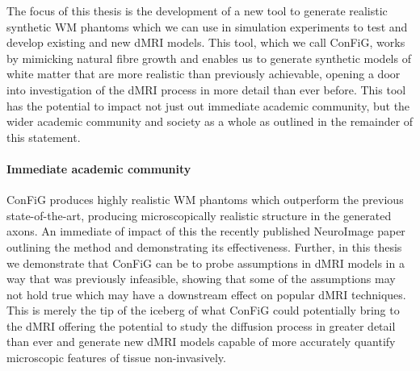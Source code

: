 \begin{comment}
In this thesis, we demonstrate the performance of \ac{ConFiG}, showing that it produces \ac{WM} phantoms at higher fibre density (an important propery for realistic phantoms) than the previous state-of-the-art while also producing microscopically realistic structure in the generated axons.
We apply \ac{ConFiG} to probe assumptions in \ac{dMRI} models in a way that was previously infeasible, showing that some of the assumptions may not hold true which may have a downstream effect on popular \ac{dMRI} techniques.

However, \ac{ConFiG} could have a wider reaching impact than that. With \ac{ConFiG} we have the potential to develop new models which will enable us to garner more detailed information from the \ac{dMRI} signal, hopefully leading to better diagnosis and monitoring of diseases such as \ac{MS}.
Not only that, but the idea behind \ac{ConFiG} could be extended to produce phantoms for other tissues including grey matter and non-brain tissues, potentially creating a whole suite of realistic tissues to build new models for all sorts of applications.

\end{comment}

The focus of this thesis is the development of a new tool to generate realistic synthetic \ac{WM} phantoms which we can use in simulation experiments to test and develop existing and new \ac{dMRI} models. This tool, which we call \acs{ConFiG}, works by mimicking natural fibre growth and enables us to generate synthetic models of white matter that are more realistic than previously achievable, opening a door into investigation of the \ac{dMRI} process in more detail than ever before.
This tool has the potential to impact not just out immediate academic community, but the wider academic community and society as a whole as outlined in the remainder of this statement.

\paragraph{Immediate academic community}
\ac{ConFiG} produces highly realistic \ac{WM} phantoms which outperform the previous state-of-the-art, producing microscopically realistic structure in the generated axons. An immediate of impact of this the recently published NeuroImage paper outlining the method and demonstrating its effectiveness. Further, in this thesis we demonstrate that \ac{ConFiG} can be to probe assumptions in \ac{dMRI} models in a way that was previously infeasible, showing that some of the assumptions may not hold true which may have a downstream effect on popular \ac{dMRI} techniques. This is merely the tip of the iceberg of what \ac{ConFiG} could potentially bring to the \ac{dMRI} offering the potential to study the diffusion process in greater detail than ever and generate new \ac{dMRI} models capable of more accurately quantify microscopic features of tissue non-invasively.


